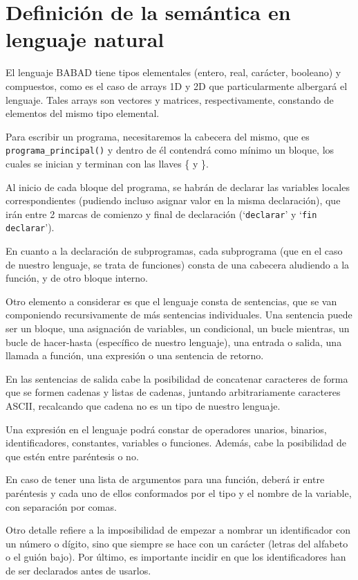 \section{Definición de la semántica en lenguaje natural}

El lenguaje BABAD tiene tipos elementales (entero, real, carácter, booleano) y compuestos, como es el caso de arrays 1D y 2D que particularmente albergará el lenguaje. Tales arrays son vectores y matrices, respectivamente, constando de elementos del mismo tipo elemental.

Para escribir un programa, necesitaremos la cabecera del mismo, que es \texttt{programa\_principal()} y dentro de él contendrá como mínimo un bloque, los cuales se inician y terminan con las llaves \{ y \}.

Al inicio de cada bloque del programa, se habrán de declarar las variables locales correspondientes (pudiendo incluso asignar valor en la misma declaración), que irán entre 2 marcas de comienzo y final de declaración (`\texttt{declarar}' y `\texttt{fin declarar}').

En cuanto a la declaración de subprogramas, cada subprograma (que en el caso  de nuestro lenguaje, se trata de funciones) consta de una cabecera aludiendo a la función, y de otro bloque interno.

Otro elemento a considerar es que el lenguaje consta de sentencias, que se van componiendo recursivamente de más sentencias individuales. Una sentencia puede ser un bloque, una asignación de variables, un condicional, un bucle mientras, un bucle de hacer-hasta (específico de nuestro lenguaje), una entrada o salida, una llamada a función, una expresión o una sentencia de retorno. 

En las sentencias de salida cabe la posibilidad de concatenar caracteres de forma que se formen cadenas y listas de cadenas, juntando arbitrariamente caracteres ASCII, recalcando que cadena no es un tipo de nuestro lenguaje.

Una expresión en el lenguaje podrá constar de operadores unarios, binarios, identificadores, constantes, variables o funciones. Además, cabe la posibilidad de que estén entre paréntesis o no.

En caso de tener una lista de argumentos para una función, deberá ir entre paréntesis y cada uno de ellos conformados por el tipo y el nombre de la variable, con separación por comas.

Otro detalle refiere a la imposibilidad de empezar a nombrar un identificador con un número o dígito, sino que siempre se hace con un carácter (letras del alfabeto o el guión bajo). Por último, es importante incidir en que los identificadores han de ser declarados antes de usarlos.
